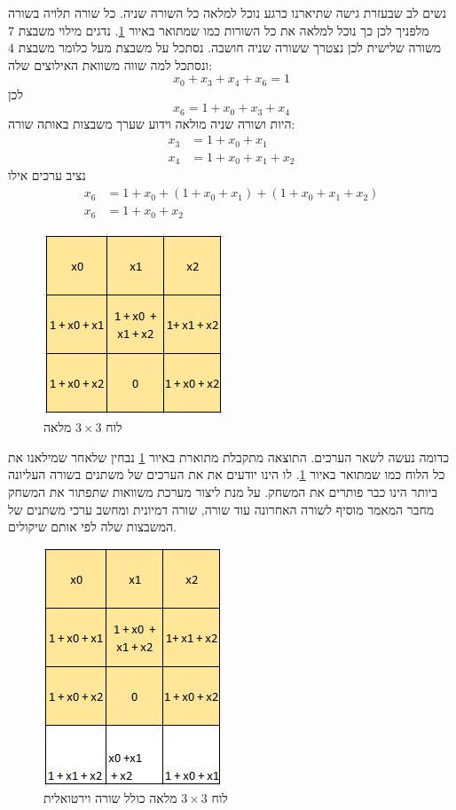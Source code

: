 \documentclass[12pt,leqno]{article}
\begin{document}
נשים לב שבעזרת גישה שתיארנו כרגע נוכל למלאה כל השורה שניה.
כל שורה תלויה בשורה מלפניך לכן כך נוכל למלאה את כל השורות 
כמו שמתואר באיור 
\ref{fig: 3 x 3 board fill intire board}.
נדגים מילוי משבצת
$7$
משורה שלישית לכן נצטרך ששורה
שניה חושבה.
נסתכל על משבצת מעל 
כלומר משבצת 
$4$
ונסתכל למה שווה משוואת האילוצים שלה:
\[ x_0 + x_3 + x_4 + x_6 = 1 \]
לכן 
\[ x_6 = 1 + x_0 + x_3 + x_4  \]
היות ושורה שניה מולאה וידוע שערך משבצות 
באותה שורה: 
\begin{align*}
    x_3 &= 1 + x_0 + x_1 \\
    x_4 &= 1 + x_0 + x_1 + x_2
\end{align*}
נציב ערכים אילו
\begin{align*}
    x_6 &= 1 + x_0 + (1 + x_0 + x_1) + (1 + x_0 + x_1 + x_2) \\
    x_6 &= 1 + x_0 + x_2
\end{align*}
\begin{figure}[ht]
    \caption{לוח 
    $3 \times 3$
    מלאה}
    \label{fig: 3 x 3 board fill intire board}
    \centering
    \includegraphics[width=.3\textwidth,height=.3\textheight,keepaspectratio]{images/3x3_fill_all.PNG}
\end{figure}
כדומה נעשה לשאר הערכים.
התוצאה מתקבלת מתוארת באיור 
\ref{fig: 3 x 3 board fill intire board}
נבחין שלאחר שמילאנו את כל הלוח כמו שמתואר באיור 
\ref{fig: 3 x 3 board fill intire board}.
לו הינו יודעים את את הערכים של  משתנים בשורה העליונה ביותר 
הינו כבר פותרים את המשחק.
על מנת ליצור מערכת משוואות
שתפתור את המשחק
מחבר המאמר
\cite{B1}
מוסיף לשורה האחרונה עוד שורה, שורה דמיונית ומחשב ערכי 
משתנים של המשבצות שלה לפי אותם שיקולים.

\begin{figure}[ht]
    \caption{לוח 
    $3 \times 3$
    מלאה
    כולל שורה וירטואלית
    }
    \label{fig: 3 x 3 board fill with virtual}
    \centering
    \includegraphics[width=.3\textwidth,height=.3\textheight,keepaspectratio]{images/3x3_fill_virtual.PNG}
\end{figure}
\end{document}
